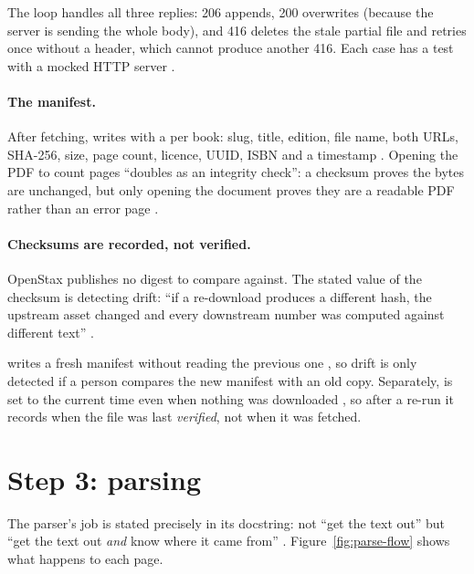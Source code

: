 The loop handles all three replies: 206 appends, 200 overwrites (because the server is sending the whole body), and 416 deletes the stale partial file and retries once without a  header, which cannot produce another 416. Each case has a test with a mocked HTTP server .

\paragraph{The manifest.} After fetching,  writes  with a  per book: slug, title, edition, file name, both URLs, SHA-256, size, page count, licence, UUID, ISBN and a timestamp . Opening the PDF to count pages \enquote{doubles as an integrity check}: a checksum proves the bytes are unchanged, but only opening the document proves they are a readable PDF rather than an error page .

\paragraph{Checksums are recorded, not verified.} OpenStax publishes no digest to compare against. The stated value of the checksum is detecting drift: \enquote{if a re-download produces a different hash, the upstream asset changed and every downstream number was computed against different text} .

\begin{inferred}
 writes a fresh manifest without reading the previous one , so drift is only detected if a person compares the new manifest with an old copy. Separately,  is set to the current time even when nothing was downloaded , so after a re-run it records when the file was last \emph{verified}, not when it was fetched.
\end{inferred}

\section{Step 3: parsing}
\label{sec:parse}

The parser's job is stated precisely in its docstring: not \enquote{get the text out} but \enquote{get the text out \emph{and} know where it came from} . Figure~\ref{fig:parse-flow} shows what happens to each page.

